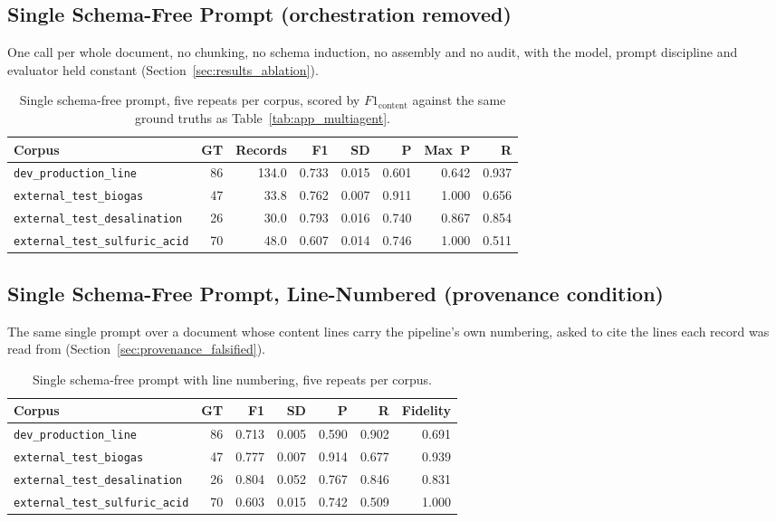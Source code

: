 \documentclass[11pt]{article}
\begin{document}
\subsection*{Single Schema-Free Prompt (orchestration removed)}
One call per whole document, no chunking, no schema induction, no assembly and
no audit, with the model, prompt discipline and evaluator held constant
(Section~\ref{sec:results_ablation}).
\begin{table}[H]\centering
\caption{Single schema-free prompt, five repeats per corpus, scored by
$F1_{\text{content}}$ against the same ground truths as
Table~\ref{tab:app_multiagent}.}
\label{tab:app_singleprompt}
\small\begin{tabular}{@{}lrrrrrrr@{}}\toprule
\textbf{Corpus} & \textbf{GT} & \textbf{Records} & \textbf{F1} & \textbf{SD} & \textbf{P} & \textbf{Max~P} & \textbf{R} \\ \midrule
\texttt{dev\_production\_line} & 86 & 134.0 & 0.733 & 0.015 & 0.601 & 0.642 & 0.937 \\
\midrule
\texttt{external\_test\_biogas} & 47 & 33.8 & 0.762 & 0.007 & 0.911 & 1.000 & 0.656 \\
\texttt{external\_test\_desalination} & 26 & 30.0 & 0.793 & 0.016 & 0.740 & 0.867 & 0.854 \\
\texttt{external\_test\_sulfuric\_acid} & 70 & 48.0 & 0.607 & 0.014 & 0.746 & 1.000 & 0.511 \\
\bottomrule\end{tabular}\end{table}

\subsection*{Single Schema-Free Prompt, Line-Numbered (provenance condition)}
The same single prompt over a document whose content lines carry the pipeline's
own numbering, asked to cite the lines each record was read from
(Section~\ref{sec:provenance_falsified}).
\begin{table}[H]\centering
\caption{Single schema-free prompt with line numbering, five repeats per corpus.}
\label{tab:app_singleprompt_cited}
\small\begin{tabular}{@{}lrrrrrr@{}}\toprule
\textbf{Corpus} & \textbf{GT} & \textbf{F1} & \textbf{SD} & \textbf{P} & \textbf{R} & \textbf{Fidelity} \\ \midrule
\texttt{dev\_production\_line} & 86 & 0.713 & 0.005 & 0.590 & 0.902 & 0.691 \\
\midrule
\texttt{external\_test\_biogas} & 47 & 0.777 & 0.007 & 0.914 & 0.677 & 0.939 \\
\texttt{external\_test\_desalination} & 26 & 0.804 & 0.052 & 0.767 & 0.846 & 0.831 \\
\texttt{external\_test\_sulfuric\_acid} & 70 & 0.603 & 0.015 & 0.742 & 0.509 & 1.000 \\
\bottomrule\end{tabular}\end{table}
\end{document}

